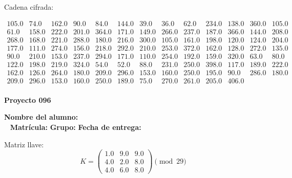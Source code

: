 \documentclass[12pt]{article}
\begin{document}
Cadena cifrada:
\begin{center}
$\begin{array}{lllllllllllll}
105.0 & 74.0 & 162.0 & 90.0 & 84.0 & 144.0 & 39.0 & 36.0 & 62.0 & 234.0 & 138.0 & 360.0 & 105.0\\
61.0 & 158.0 & 222.0 & 201.0 & 364.0 & 171.0 & 149.0 & 266.0 & 237.0 & 187.0 & 366.0 & 144.0 & 208.0\\
268.0 & 168.0 & 221.0 & 288.0 & 180.0 & 216.0 & 300.0 & 105.0 & 161.0 & 198.0 & 120.0 & 124.0 & 204.0\\
177.0 & 111.0 & 274.0 & 156.0 & 218.0 & 292.0 & 210.0 & 253.0 & 372.0 & 162.0 & 128.0 & 272.0 & 135.0\\
90.0 & 210.0 & 153.0 & 237.0 & 294.0 & 171.0 & 110.0 & 254.0 & 192.0 & 159.0 & 320.0 & 63.0 & 80.0\\
122.0 & 198.0 & 219.0 & 324.0 & 54.0 & 52.0 & 88.0 & 231.0 & 250.0 & 398.0 & 117.0 & 189.0 & 222.0\\
162.0 & 126.0 & 264.0 & 180.0 & 209.0 & 296.0 & 153.0 & 160.0 & 250.0 & 195.0 & 90.0 & 286.0 & 180.0\\
209.0 & 296.0 & 153.0 & 160.0 & 250.0 & 189.0 & 75.0 & 270.0 & 261.0 & 205.0 & 406.0\\
\end{array}$
\end{center}

\newpage


\textbf{Proyecto 096}

\textbf{Nombre del alumno:} \underline{\hspace{13cm}}\\\
\vspace{1cm}
\textbf{Matrícula:} \underline{\hspace{4cm}} \hspace{1cm}
\textbf{Grupo:} \underline{\hspace{2cm}}
\textbf{Fecha de entrega:} \underline{\hspace{2cm}}

\medskip

Matriz llave:
\[
K = \begin{pmatrix}
1.0 & 9.0 & 9.0\\
4.0 & 2.0 & 8.0\\
4.0 & 6.0 & 8.0
\end{pmatrix} \pmod{29}
\]
\end{document}
